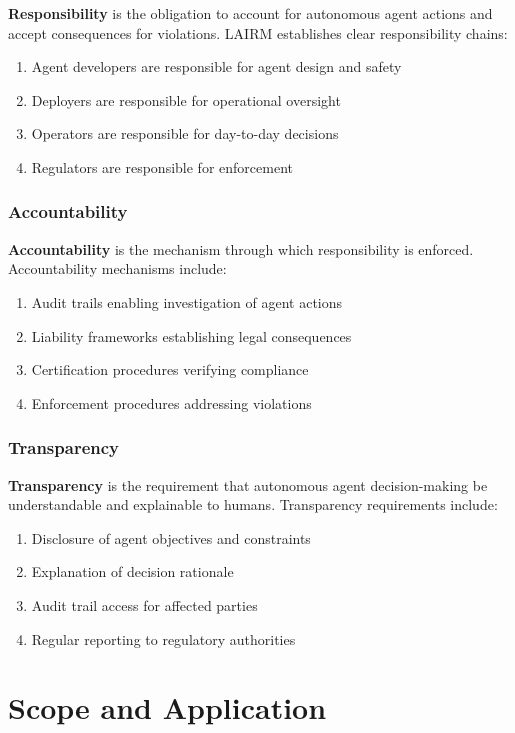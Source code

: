 \documentclass[12pt,a4paper,twoside,openright]{book}
\begin{document}
\textbf{Responsibility} is the obligation to account for autonomous agent actions and accept consequences for violations. LAIRM establishes clear responsibility chains:
\begin{enumerate}
    \item Agent developers are responsible for agent design and safety
    \item Deployers are responsible for operational oversight
    \item Operators are responsible for day-to-day decisions
    \item Regulators are responsible for enforcement
\end{enumerate}

\subsection{Accountability}

\textbf{Accountability} is the mechanism through which responsibility is enforced. Accountability mechanisms include:
\begin{enumerate}
    \item Audit trails enabling investigation of agent actions
    \item Liability frameworks establishing legal consequences
    \item Certification procedures verifying compliance
    \item Enforcement procedures addressing violations
\end{enumerate}

\subsection{Transparency}

\textbf{Transparency} is the requirement that autonomous agent decision-making be understandable and explainable to humans. Transparency requirements include:
\begin{enumerate}
    \item Disclosure of agent objectives and constraints
    \item Explanation of decision rationale
    \item Audit trail access for affected parties
    \item Regular reporting to regulatory authorities
\end{enumerate}

\chapter{Scope and Application}
\label{ch:scope}
\end{document}
